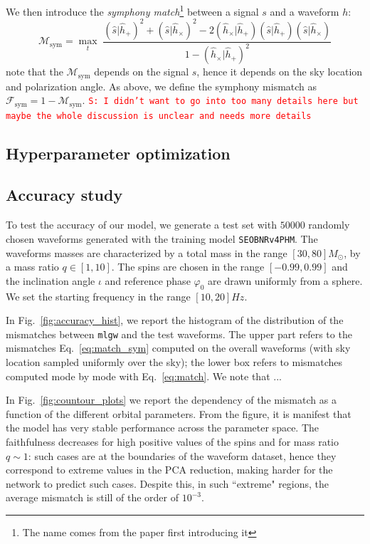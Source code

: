 \documentclass[twocolumn,showpacs,preprintnumbers,nofootinbib,prd,
superscriptaddress,10pt]{revtex4-1}
\newcommand{\rescalar}[2]{( #1 |#2 )}
\newcommand{\stefano}[1]{{\textcolor{red}{\texttt{S: #1}} }}
\begin{document}
We then introduce the {\it symphony match}\footnote{The name comes from the paper \cite{} first introducing it} between a signal $s$ and a waveform $h$:
\begin{equation}\label{eq:match_sym}
	\mathcal{M}_\mathrm{sym} = \max_t \;
		\frac{ \rescalar{\hat{s}}{\hat{h}_+}^2 + \rescalar{\hat{s}}{\hat{h}_\times}^2 - 2 \rescalar{\hat{h}_\times}{\hat{h}_+} \rescalar{\hat{s}}{\hat{h}_+} \rescalar{\hat{s}}{\hat{h}_\times}}
		{1-\rescalar{\hat{h}_\times}{\hat{h}_+}^2}
\end{equation}
note that the $\mathcal{M}_\mathrm{sym}$ depends on the signal $s$, hence it depends on the sky location and polarization angle.
As above, we define the symphony mismatch as $\mathcal{F}_\mathrm{sym} = 1 - \mathcal{M}_\mathrm{sym}$.
\stefano{I didn't want to go into too many details here but maybe the whole discussion is unclear and needs more details}

\subsection{Hyperparameter optimization}
\label{sec:hyperparameter}

\subsection{Accuracy study}\label{sec:accuracy}

To test the accuracy of our model, we generate a test set with $50000$ randomly chosen waveforms generated with the training model \texttt{SEOBNRv4PHM}.
The waveforms masses are characterized by a total mass in the range $[30, 80] M_\odot$, by a mass ratio $q \in [1, 10]$. The spins are chosen in the range $[-0.99, 0.99]$ and the inclination angle $\iota$ and reference phase $\varphi_0$ are drawn uniformly from a sphere.
We set the starting frequency in the range $[10, 20]Hz$.

In Fig.~\ref{fig:accuracy_hist}, we report the histogram of the distribution of the mismatches between \texttt{mlgw} and the test waveforms. The upper part refers to the mismatches Eq.~\eqref{eq:match_sym} computed on the overall waveforms (with sky location sampled uniformly over the sky); the lower box refers to mismatches computed mode by mode with Eq.~\eqref{eq:match}.
We note that ...

In Fig.~\ref{fig:countour_plots} we report the dependency of the mismatch as a function of the different orbital parameters.
From the figure, it is manifest that the model has very stable performance across the parameter space.
The faithfulness decreases for high positive values of the spins and for mass ratio $q\sim 1$: such cases are at the boundaries of the waveform dataset, hence they correspond to extreme values in the PCA reduction, making harder for the network to predict such cases. Despite this, in such ``extreme" regions, the average mismatch is still of the order of $10^{-3}$.
\end{document}
